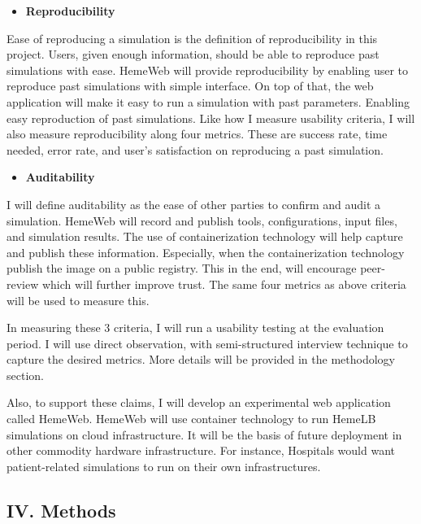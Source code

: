 \documentclass[]{article}
\providecommand{\tightlist}{%
  \setlength{\itemsep}{0pt}\setlength{\parskip}{0pt}}
\begin{document}
\begin{itemize}
\tightlist
\item
  \textbf{Reproducibility}
\end{itemize}

Ease of reproducing a simulation is the definition of reproducibility in
this project. Users, given enough information, should be able to
reproduce past simulations with ease. HemeWeb will provide
reproducibility by enabling user to reproduce past simulations with
simple interface. On top of that, the web application will make it easy
to run a simulation with past parameters. Enabling easy reproduction of
past simulations. Like how I measure usability criteria, I will also
measure reproducibility along four metrics. These are success rate, time
needed, error rate, and user's satisfaction on reproducing a past
simulation.

\begin{itemize}
\tightlist
\item
  \textbf{Auditability}
\end{itemize}

I will define auditability as the ease of other parties to confirm and
audit a simulation. HemeWeb will record and publish tools,
configurations, input files, and simulation results. The use of
containerization technology will help capture and publish these
information. Especially, when the containerization technology publish
the image on a public registry. This in the end, will encourage
peer-review which will further improve trust. The same four metrics as
above criteria will be used to measure this.

In measuring these 3 criteria, I will run a usability testing at the
evaluation period. I will use direct observation, with semi-structured
interview technique to capture the desired metrics. More details will be
provided in the methodology section.

Also, to support these claims, I will develop an experimental web
application called HemeWeb. HemeWeb will use container technology to run
HemeLB simulations on cloud infrastructure. It will be the basis of
future deployment in other commodity hardware infrastructure. For
instance, Hospitals would want patient-related simulations to run on
their own infrastructures.

\subsection{IV. Methods}\label{iv.-methods}
\end{document}
